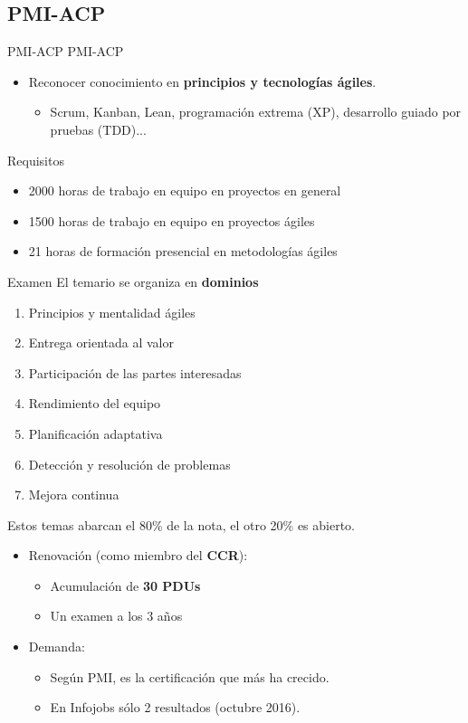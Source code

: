 \subsection{PMI-ACP}
\begin{frame}[allowframebreaks]{PMI-ACP}
	PMI-ACP 
	\begin{itemize}
		\item Reconocer conocimiento en \textbf{principios y tecnologías ágiles}.
		\begin{itemize}
			\item Scrum, Kanban, Lean, programación extrema (XP), desarrollo guiado por pruebas (TDD)...
		\end{itemize}
	\end{itemize}
	\begin{block}{Requisitos}
		\begin{itemize}
			\item 2000 horas de trabajo en equipo en proyectos en general
			\item 1500 horas de trabajo en equipo en proyectos ágiles
			\item 21 horas de formación presencial en metodologías ágiles
		\end{itemize}
	\end{block}
	\begin{block}{Examen}
		El temario se organiza en \textbf{dominios}
		\begin{enumerate}
			\item Principios y mentalidad ágiles
			\item Entrega orientada al valor
			\item Participación de las partes interesadas
			\item Rendimiento del equipo
			\item Planificación adaptativa
			\item Detección y resolución de problemas
			\item Mejora continua
		\end{enumerate}
		Estos temas abarcan el 80\% de la nota, el otro 20\% es abierto.
	\end{block}
	
	\framebreak
	
	\begin{itemize}
		\item Renovación (como miembro del \textbf{CCR}):
		\begin{itemize}
			\item Acumulación de \textbf{30 PDUs}
			\item Un examen a los 3 años
		\end{itemize}
		\item Demanda:
		\begin{itemize}
			\item Según PMI, es la certificación que más ha crecido.
			\item En Infojobs sólo 2 resultados (octubre 2016).
		\end{itemize}
	\end{itemize}
\end{frame}

